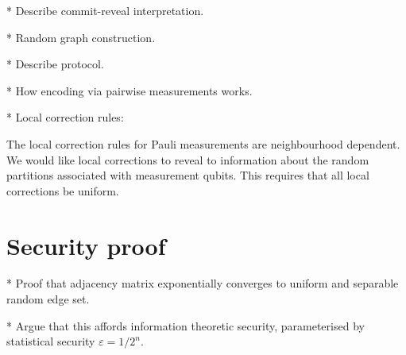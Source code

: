 \documentclass[twocolumn, aps, amsmath, amssymb, nofootinbib, superscriptaddress, longbibliography, doublefloatfix, table-of-contents, eqsecnum, rmp]{revtex4-2}
\begin{document}
* Describe commit-reveal interpretation.

* Random graph construction.

* Describe protocol.

* How encoding via pairwise measurements works.

* Local correction rules:

The local correction rules for Pauli measurements are neighbourhood dependent. We would like local corrections to reveal to information about the random partitions associated with measurement qubits. This requires that all local corrections be uniform.
 
\section{Security proof}

* Proof that adjacency matrix exponentially converges to uniform and separable random edge set.

* Argue that this affords information theoretic security, parameterised by statistical security $\varepsilon=1/2^n$.


\end{document}
